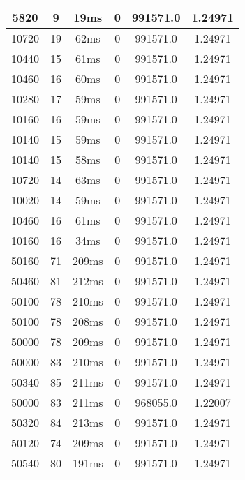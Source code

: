 \documentclass[./main.tex]{subfiles}
\begin{document}
\begin{table}
\begin{tabular}{ c | c | c | c | c | c }
        \rowcolor{lightgray} 5820 & 9 & 19ms & 0 & 991571.0 & 1.24971 \\
        \hline
        \rowcolor{lightgray} 10720 & 19 & 62ms & 0 & 991571.0 & 1.24971 \\
        \rowcolor{lightgray} 10440 & 15 & 61ms & 0 & 991571.0 & 1.24971 \\
        \rowcolor{lightgray} 10460 & 16 & 60ms & 0 & 991571.0 & 1.24971 \\
        \rowcolor{lightgray} 10280 & 17 & 59ms & 0 & 991571.0 & 1.24971 \\
        \rowcolor{lightgray} 10160 & 16 & 59ms & 0 & 991571.0 & 1.24971 \\
        \rowcolor{lightgray} 10140 & 15 & 59ms & 0 & 991571.0 & 1.24971 \\
        \rowcolor{lightgray} 10140 & 15 & 58ms & 0 & 991571.0 & 1.24971 \\
        \rowcolor{lightgray} 10720 & 14 & 63ms & 0 & 991571.0 & 1.24971 \\
        \rowcolor{lightgray} 10020 & 14 & 59ms & 0 & 991571.0 & 1.24971 \\
        \rowcolor{lightgray} 10460 & 16 & 61ms & 0 & 991571.0 & 1.24971 \\
        \rowcolor{lightgray} 10160 & 16 & 34ms & 0 & 991571.0 & 1.24971 \\
        \hline
        \rowcolor{lightgray} 50160 & 71 & 209ms & 0 & 991571.0 & 1.24971 \\
        \rowcolor{lightgray} 50460 & 81 & 212ms & 0 & 991571.0 & 1.24971 \\
        \rowcolor{lightgray} 50100 & 78 & 210ms & 0 & 991571.0 & 1.24971 \\
        \rowcolor{lightgray} 50100 & 78 & 208ms & 0 & 991571.0 & 1.24971 \\
        \rowcolor{lightgray} 50000 & 78 & 209ms & 0 & 991571.0 & 1.24971 \\
        \rowcolor{lightgray} 50000 & 83 & 210ms & 0 & 991571.0 & 1.24971 \\
        \rowcolor{lightgray} 50340 & 85 & 211ms & 0 & 991571.0 & 1.24971 \\
        50000 & 83 & 211ms & 0 & 968055.0 & 1.22007 \\
        \rowcolor{lightgray} 50320 & 84 & 213ms & 0 & 991571.0 & 1.24971 \\
        \rowcolor{lightgray} 50120 & 74 & 209ms & 0 & 991571.0 & 1.24971 \\
        \rowcolor{lightgray} 50540 & 80 & 191ms & 0 & 991571.0 & 1.24971 \\

\end{tabular}
\end{table}
\end{document}
